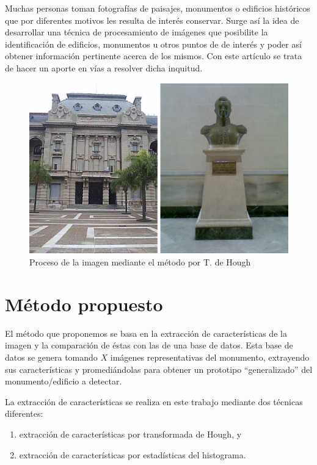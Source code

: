 \documentclass[conference,spanish,a4paper,10pt,oneside,final]{tfmpd}
\begin{document}
Muchas personas toman fotografías de paisajes, monumentos o edificios históricos
que por diferentes motivos les resulta de interés conservar.
Surge así la idea de desarrollar una técnica de procesamiento de imágenes
que posibilite la identificación de edificios, monumentos u otros puntos de
de interés y poder así obtener información pertinente
acerca de los mismos. Con este artículo se trata
de hacer un aporte en vías a resolver dicha inquitud.

\begin{figure}
\begin{center}
\includegraphics[scale=0.25]{../diagramas/dibujo} 
\end{center}
\caption{Proceso de la imagen mediante el método por T. de Hough}
\label{procesohough}
\end{figure}

%
%
%
%
\section{Método propuesto}
El método que proponemos se basa en la extracción de características de la
imagen y la comparación de éstas con las de una base de datos.
Esta base de datos se genera tomando $X$ imágenes representativas del monumento,
extrayendo sus características y promediándolas para obtener un prototipo
``generalizado'' del monumento/edificio a detectar.

La extracción de características se realiza en este trabajo mediante dos
técnicas diferentes:
\begin{enumerate}
\item extracción de características por transformada de Hough, y
\item extracción de características por estadísticas del histograma.
\end{enumerate}
\end{document}
